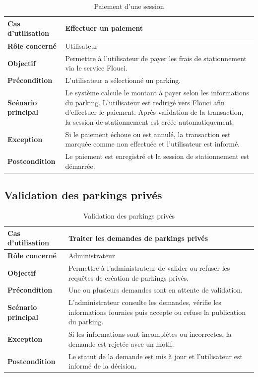 \begin{table}[H]
\centering
\renewcommand{\arraystretch}{1.25}
\begin{tabular}{|p{}|p{}|}
\hline
\textbf{Cas d'utilisation} & Effectuer un paiement \\
\hline
\textbf{Rôle concerné} & Utilisateur \\
\hline
\textbf{Objectif} & Permettre à l'utilisateur de payer les frais de stationnement via le service Flouci. \\
\hline
\textbf{Précondition} & L'utilisateur a sélectionné un parking. \\
\hline
\textbf{Scénario principal} & Le système calcule le montant à payer selon les informations du parking. L'utilisateur est redirigé vers Flouci afin d'effectuer le paiement. Après validation de la transaction, la session de stationnement est créée automatiquement. \\
\hline
\textbf{Exception} & Si le paiement échoue ou est annulé, la transaction est marquée comme non effectuée et l'utilisateur est informé. \\
\hline
\textbf{Postcondition} & Le paiement est enregistré et la session de stationnement est démarrée. \\
\hline
\end{tabular}
\caption{Paiement d'une session}
\label{tab:payment}
\end{table}

\subsection{Validation des parkings privés}

\begin{table}[H]
\centering
\renewcommand{\arraystretch}{1.25}
\begin{tabular}{|p{}|p{}|}
\hline
\textbf{Cas d'utilisation} & Traiter les demandes de parkings privés \\
\hline
\textbf{Rôle concerné} & Administrateur \\
\hline
\textbf{Objectif} & Permettre à l'administrateur de valider ou refuser les requêtes de création de parkings privés. \\
\hline
\textbf{Précondition} & Une ou plusieurs demandes sont en attente de validation. \\
\hline
\textbf{Scénario principal} & L'administrateur consulte les demandes, vérifie les informations fournies puis accepte ou refuse la publication du parking. \\
\hline
\textbf{Exception} & Si les informations sont incomplètes ou incorrectes, la demande est rejetée avec un motif. \\
\hline
\textbf{Postcondition} & Le statut de la demande est mis à jour et l'utilisateur est informé de la décision. \\
\hline
\end{tabular}
\caption{Validation des parkings privés}
\label{tab:admin_private_parking}
\end{table}


